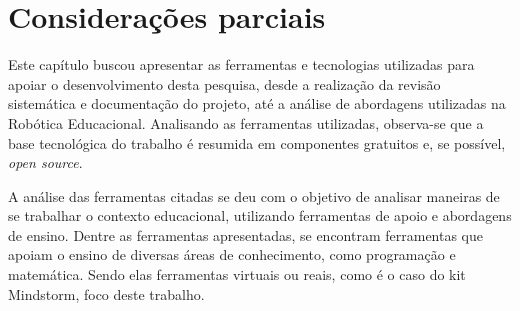 	
\section{Considerações parciais} %
\label{sec:considerações_parciais}

	Este capítulo buscou apresentar as ferramentas e tecnologias utilizadas para apoiar o desenvolvimento desta pesquisa, desde a realização da revisão sistemática e documentação do projeto, até a análise de abordagens utilizadas na Robótica Educacional. Analisando as ferramentas utilizadas, observa-se que a base tecnológica do trabalho é resumida em componentes gratuitos e, se possível, \textit{open source}.

	A análise das ferramentas citadas se deu com o objetivo de analisar maneiras de se trabalhar o contexto educacional, utilizando ferramentas de apoio e abordagens de ensino. Dentre as ferramentas apresentadas, se encontram ferramentas que apoiam o ensino de diversas áreas de conhecimento, como programação e matemática. Sendo elas ferramentas virtuais ou reais, como é o caso do kit Mindstorm, foco deste trabalho.


